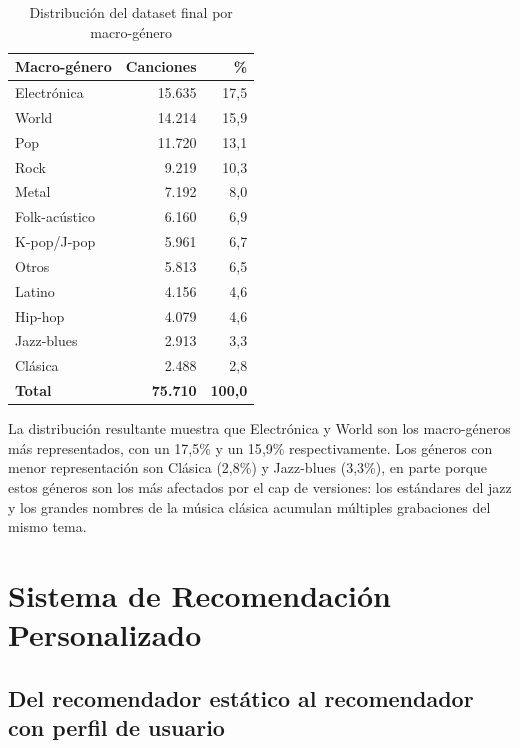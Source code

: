 \documentclass[12pt, a4paper]{book}
\theoremstyle{definition}
\begin{document}
\begin{table}[H]
\centering
\caption{Distribución del dataset final por macro-género}
\label{tab:dist_final}
\small
\begin{tabular}{lrr}
\toprule
\textbf{Macro-género} & \textbf{Canciones} & \textbf{\%} \\
\midrule
Electrónica   & 15.635 & 17{,}5 \\
World         & 14.214 & 15{,}9 \\
Pop           & 11.720 & 13{,}1 \\
Rock          &  9.219 & 10{,}3 \\
Metal         &  7.192 &  8{,}0 \\
Folk-acústico &  6.160 &  6{,}9 \\
K-pop/J-pop   &  5.961 &  6{,}7 \\
Otros         &  5.813 &  6{,}5 \\
Latino        &  4.156 &  4{,}6 \\
Hip-hop       &  4.079 &  4{,}6 \\
Jazz-blues    &  2.913 &  3{,}3 \\
Clásica       &  2.488 &  2{,}8 \\
\midrule
\textbf{Total} & \textbf{75.710} & \textbf{100{,}0} \\
\bottomrule
\end{tabular}
\end{table}

La distribución resultante muestra que Electrónica y World son los
macro-géneros más representados, con un 17{,}5\% y un 15{,}9\%
respectivamente. Los géneros con menor representación son Clásica
(2{,}8\%) y Jazz-blues (3{,}3\%), en parte porque estos géneros son los
más afectados por el cap de versiones: los estándares del jazz y los
grandes nombres de la música clásica acumulan múltiples grabaciones del
mismo tema.

\chapter{Sistema de Recomendación Personalizado}
\label{ch:recomendador}

\section{Del recomendador estático al recomendador con perfil de usuario}
\end{document}
